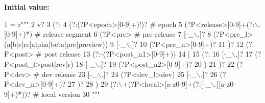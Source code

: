 {\bfseries Initial value\+:}
\begin{DoxyCode}
1 =  \textcolor{stringliteral}{r"""}
2 \textcolor{stringliteral}{    v?}
3 \textcolor{stringliteral}{    (?:}
4 \textcolor{stringliteral}{        (?:(?P<epoch>[0-9]+)!)?                           # epoch}
5 \textcolor{stringliteral}{        (?P<release>[0-9]+(?:\(\backslash\).[0-9]+)*)                  # release segment}
6 \textcolor{stringliteral}{        (?P<pre>                                          # pre-release}
7 \textcolor{stringliteral}{            [-\_\(\backslash\).]?}
8 \textcolor{stringliteral}{            (?P<pre\_l>(a|b|c|rc|alpha|beta|pre|preview))}
9 \textcolor{stringliteral}{            [-\_\(\backslash\).]?}
10 \textcolor{stringliteral}{            (?P<pre\_n>[0-9]+)?}
11 \textcolor{stringliteral}{        )?}
12 \textcolor{stringliteral}{        (?P<post>                                         # post release}
13 \textcolor{stringliteral}{            (?:-(?P<post\_n1>[0-9]+))}
14 \textcolor{stringliteral}{            |}
15 \textcolor{stringliteral}{            (?:}
16 \textcolor{stringliteral}{                [-\_\(\backslash\).]?}
17 \textcolor{stringliteral}{                (?P<post\_l>post|rev|r)}
18 \textcolor{stringliteral}{                [-\_\(\backslash\).]?}
19 \textcolor{stringliteral}{                (?P<post\_n2>[0-9]+)?}
20 \textcolor{stringliteral}{            )}
21 \textcolor{stringliteral}{        )?}
22 \textcolor{stringliteral}{        (?P<dev>                                          # dev release}
23 \textcolor{stringliteral}{            [-\_\(\backslash\).]?}
24 \textcolor{stringliteral}{            (?P<dev\_l>dev)}
25 \textcolor{stringliteral}{            [-\_\(\backslash\).]?}
26 \textcolor{stringliteral}{            (?P<dev\_n>[0-9]+)?}
27 \textcolor{stringliteral}{        )?}
28 \textcolor{stringliteral}{    )}
29 \textcolor{stringliteral}{    (?:\(\backslash\)+(?P<local>[a-z0-9]+(?:[-\_\(\backslash\).][a-z0-9]+)*))?       # local version}
30 \textcolor{stringliteral}{"""}
\end{DoxyCode}
